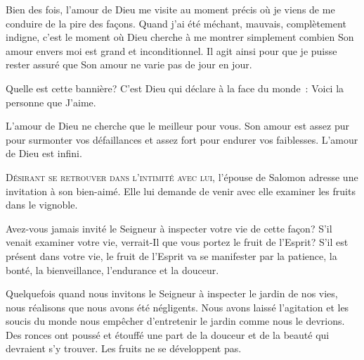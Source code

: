 Bien des fois, l'amour de Dieu me visite au moment précis
 où je viens de me conduire de la pire des façons.
 Quand j'ai été méchant, mauvais, complètement indigne,
 c'est le moment où Dieu cherche à me montrer simplement
 combien Son amour envers moi est grand et inconditionnel.
 Il agit ainsi pour que je puisse rester assuré que Son amour
 ne varie pas de jour en jour. 

Quelle est cette bannière?
 C'est Dieu qui déclare à la face du monde~: 
 \og Voici la personne que J'aime. \fg{}



L'amour de Dieu ne cherche que le meilleur pour vous.
 Son amour est assez pur pour surmonter vos défaillances
 et assez fort pour endurer vos faiblesses.
 L'amour de Dieu est infini. 

\dvrule






\lettrine{D}{ésirant se retrouver dans l'intimité avec lui,}
 l'épouse de Salomon adresse une invitation à son bien-aimé.
 Elle lui demande de venir avec elle examiner les fruits dans le vignoble.

Avez-vous jamais invité le Seigneur à inspecter votre vie de cette façon?
 S'il venait examiner votre vie, verrait-Il que vous portez
 le fruit de l'Esprit? S'il est présent dans votre vie,
 le fruit de l'Esprit va se manifester par la patience, la bonté,
 la bienveillance, l'endurance et la douceur.


Quelquefois quand nous invitons le Seigneur à inspecter le jardin de nos vies,
 nous réalisons que nous avons été négligents.
 Nous avons laissé l'agitation et les soucis du monde nous empêcher
 d'entretenir le jardin comme nous le devrions.
 Des ronces ont poussé et étouffé une part de la douceur et de la beauté
 qui devraient s'y trouver. Les fruits ne se développent pas.

